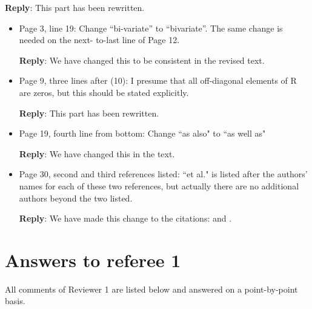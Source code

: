 \documentclass[a4paper]{article}
\def\reply{\textbf{Reply}}
\begin{document}
\reply: This part has been rewritten.

\vspace{1em}



\vspace{5mm}
\begin{itemize}[noitemsep,topsep=0pt,parsep=0pt,partopsep=0pt]

\item Page 3, line 19: Change “bi-variate” to “bivariate”. The same change is needed on the next-
to-last line of Page 12.

\reply: We have changed this to be consistent in the revised text.

\item Page 9, three lines after (10): I presume that all off-diagonal elements of R are zeros, but this
should be stated explicitly.

\reply: This part has been rewritten.

\item Page 19, fourth line from bottom: Change ``as also" to ``as well as"

\reply: We have changed this in the text.

\item Page 30, second and third references listed: ``et al." is listed after the authors’ names for each
of these two references, but actually there are no additional authors beyond the two listed.

\reply: We have made this change to the citations: \cite{genton2015cross} and \cite{french2013spatio}.
\end{itemize}


\section*{Answers to referee 1}
All comments of Reviewer 1 are listed below and answered on a point-by-point basis.
\end{document}
